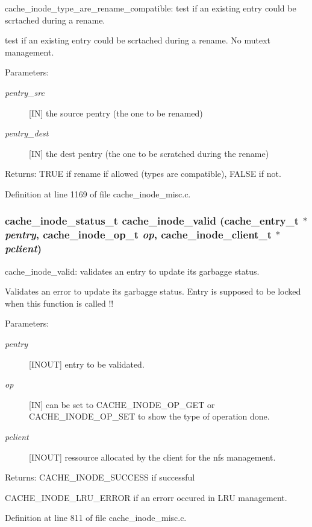 cache\_\-inode\_\-type\_\-are\_\-rename\_\-compatible: test if an existing entry could be scrtached during a rename.

test if an existing entry could be scrtached during a rename. No mutext management.

\begin{Desc}
\item[Parameters:]
\begin{description}
\item[{\em pentry\_\-src}][IN] the source pentry (the one to be renamed) \item[{\em pentry\_\-dest}][IN] the dest pentry (the one to be scratched during the rename)\end{description}
\end{Desc}
\begin{Desc}
\item[Returns:]TRUE if rename if allowed (types are compatible), FALSE if not. \end{Desc}


Definition at line 1169 of file cache\_\-inode\_\-misc.c.
\subsubsection[{cache\_\-inode\_\-valid}]{\setlength{\rightskip}{0pt plus 5cm}cache\_\-inode\_\-status\_\-t cache\_\-inode\_\-valid (cache\_\-entry\_\-t $\ast$ {\em pentry}, \/  cache\_\-inode\_\-op\_\-t {\em op}, \/  cache\_\-inode\_\-client\_\-t $\ast$ {\em pclient})}\label{cache__inode__misc_8c_a34ae3526aa5eb8bc0f96e54a3fe8861}


cache\_\-inode\_\-valid: validates an entry to update its garbagge status.

Validates an error to update its garbagge status. Entry is supposed to be locked when this function is called !!

\begin{Desc}
\item[Parameters:]
\begin{description}
\item[{\em pentry}][INOUT] entry to be validated. \item[{\em op}][IN] can be set to CACHE\_\-INODE\_\-OP\_\-GET or CACHE\_\-INODE\_\-OP\_\-SET to show the type of operation done. \item[{\em pclient}][INOUT] ressource allocated by the client for the nfs management.\end{description}
\end{Desc}
\begin{Desc}
\item[Returns:]CACHE\_\-INODE\_\-SUCCESS if successful \par
 

CACHE\_\-INODE\_\-LRU\_\-ERROR if an errorr occured in LRU management. \end{Desc}


Definition at line 811 of file cache\_\-inode\_\-misc.c.